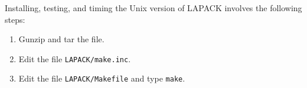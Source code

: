 \documentclass[11pt]{report}
\begin{document}
Installing, testing, and timing the Unix version of LAPACK
involves the following steps: 
\begin{enumerate}
\item Gunzip and tar the file.

\item Edit the file \texttt{LAPACK/make.inc}.
 
\item Edit the file \texttt{LAPACK/Makefile} and type \texttt{make}.

%
%
%
%
%

\end{enumerate}
\end{document}
